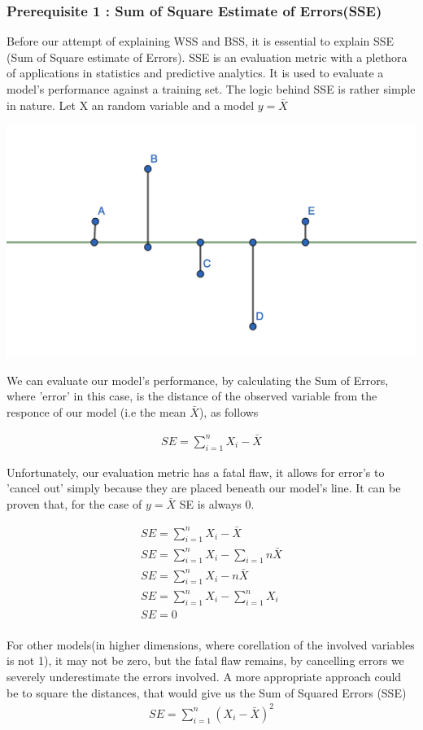\documentclass[11pt]{article}
\begin{document}
			\subsubsection*{Prerequisite 1 : Sum of Square Estimate of Errors(SSE)}
				Before our attempt of explaining WSS and BSS, it is essential to explain SSE (Sum of Square estimate of Errors). SSE is an evaluation metric with a plethora of applications in statistics and predictive analytics\cite{???}. It is used to evaluate a model's performance against a training set\cite{???}. The logic behind SSE is rather simple in nature. Let X an random variable and a model $y=\bar{X}$
				\iftrue
				\begin{center}
					\includegraphics[scale=0.5]{res/task-1/SSE-1}				
				\end{center}
				\fi
				We can evaluate our model's performance, by calculating the Sum of Errors, where 'error' in this case, is the distance of the observed variable from the responce of our model (i.e the mean $\bar{X}$), as follows
				\iftrue
				\begin{align}
					SE = \sum_{i=1}^{n}{X_i-\bar{X}}
				\end{align}
				\fi
				Unfortunately, our evaluation metric has a fatal flaw, it allows for error's to 'cancel out' simply because they are placed beneath our model's line. It can be proven that, for the case of $y=\bar{X}$ SE is always 0.
				\iftrue
				\begin{align}
					SE = \sum_{i=1}^{n}{X_i-\bar{X}} \\
					SE = \sum_{i=1}^{n}{X_i} - \sum_{i=1}{n}{\bar{X}} \\
					SE = \sum_{i=1}^{n}{X_i} - n\bar{X} \\
					SE = \sum_{i=1}^{n}{X_i} - \sum_{i=1}^{n}{X_i} \\
					SE = 0 \\
				\end{align}
				\fi
				For other models(in higher dimensions, where corellation of the involved variables is not 1), it may not be zero, but the fatal flaw remains, by cancelling errors we severely underestimate the errors involved. A more appropriate approach could be to square the distances, that would give us the Sum of Squared Errors (SSE)\\
				\iftrue
				\begin{align}
					SE = \sum_{i=1}^{n}{(X_i-\bar{X})}^2
				\end{align}
				\fi
\end{document}
